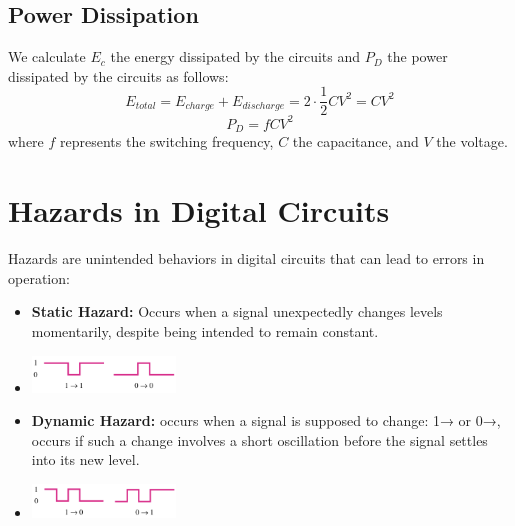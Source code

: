 \documentclass[12pt,openany]{book}
\begin{document}
			      	\subsection{Power Dissipation}
			      	
			      	We calculate $E_c$ the energy dissipated by the circuits and $P_D$ the power dissipated by the circuits as follows:
			      	\begin{equation}
			      		E_{total} = E_{charge} + E_{discharge} = 2 \cdot \frac{1}{2}CV^2 = CV^2
			      	\end{equation}
			      	\begin{equation}
			      		P_D = fCV^2
			      	\end{equation}
			      	where $f$ represents the switching frequency, $C$ the capacitance, and $V$ the voltage. 
			      	
			      	\section{Hazards in Digital Circuits}
			      	
			      	Hazards are unintended behaviors in digital circuits that can lead to errors in operation:
			      	\begin{itemize}
			      		\item[] \textbf{Static Hazard:} Occurs when a signal unexpectedly changes levels momentarily, despite being intended to remain constant.
			      		\item[] 
			      		      \begin{center}
                                \includegraphics[width=0.3\textwidth]{circuits/9.5.png}

                              \end{center}
			      		             
			      		        
        
			      		\item[] \textbf{Dynamic Hazard:} occurs
			      		      when a signal is supposed to
			      		      change: 1\;→ or 0\;→, occurs if such a change
			      		      involves a short oscillation before
			      		      the signal settles into its new level.
			      		\item[] 
			      		      \centering
			      		      \includegraphics[width=0.3\textwidth]{circuits/9.5_1.png}
			      	\end{itemize}
			      	
\end{document}
